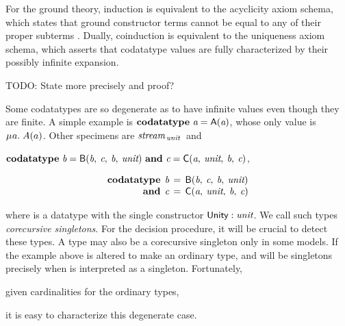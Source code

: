 For the ground theory, induction is equivalent to the acyclicity
axiom schema, which states that ground constructor terms cannot be equal to
any of their proper subterms \cite{barrett-et-al-2007}. Dually, coinduction
is equivalent to the uniqueness axiom schema, which asserts that codatatype
values are fully characterized by their possibly infinite expansion.

\begin{rep}
TODO: State more precisely and proof?
\end{rep}



{
Some codatatypes are so degenerate as to have infinite values
even though they are finite. A simple example is
\vthinspace$\textbf{codatatype}~\textit{a} = \textsf{A}(\textit{a})$, whose
only value is $\MU a.\; A(a)$. Other specimens are
$\textit{stream}_{\,\textit{unit}\,}$
and
\begin{conf}%
\vthinspace$\textbf{codatatype}~\textit{b} = \textsf{B}(\textit{b},\: \textit{c},\: \textit{b},\: \textit{unit})
~\textbf{and}~ \textit{c} = \textsf{C}(\textit{a},\: \textit{unit},\: \textit{b},\: \textit{c})$,
\end{conf}%
\begin{rep}%
\[\begin{aligned}[t]
      \textbf{codatatype}\;\, \textit{b} & \,=\, \textsf{B}(\textit{b},\: \textit{c},\: \textit{b},\: \textit{unit}) \\[-1\jot]
      \textbf{and}\;\, \textit{c} & \,=\, \textsf{C}(\textit{a},\: \textit{unit},\: \textit{b},\: \textit{c})
\end{aligned}
\]
\end{rep}%
where  is a datatype with the single constructor $\textsf{Unity} :
\textit{unit}$. We call such types
\emph{corecursive singletons}. For the decision procedure, it will be
crucial to detect these types. %
A type may also be a corecursive singleton only in some models. If the example
above is altered to make  an ordinary type,  and  will be
singletons precisely when  is interpreted as a singleton.
Fortunately, \begin{rep}given cardinalities for the ordinary types, \end{rep}%
it is easy to characterize this degenerate case.

}

